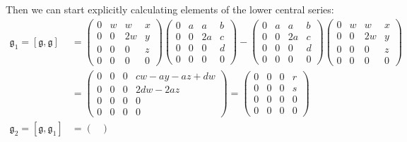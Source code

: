 \documentclass[12pt]{article}
\newcommand{\g}{\mathfrak{g}}
\begin{document}
        Then we can start explicitly calculating elements of the lower central series: 
        \begin{align*}
            \g_1 = [\g, \g] &= \begin{pmatrix}
                0 & w & w & x\\ 
                0 & 0 & 2w & y\\
                0 & 0 & 0 & z\\
                0 & 0 & 0 & 0
            \end{pmatrix}\begin{pmatrix}
                0 & a & a & b\\
                0 & 0 & 2a & c\\
                0 & 0 & 0 & d\\
                0 & 0 & 0 & 0
            \end{pmatrix} - \begin{pmatrix}
                0 & a & a & b\\
                0 & 0 & 2a & c\\
                0 & 0 & 0 & d\\
                0 & 0 & 0 & 0
            \end{pmatrix}\begin{pmatrix}
                0 & w & w & x\\ 
                0 & 0 & 2w & y\\
                0 & 0 & 0 & z\\
                0 & 0 & 0 & 0
            \end{pmatrix}\\ 
            &= \begin{pmatrix}
                0 & 0 & 0 & cw-ay-az+dw\\ 
                0 & 0 & 0 & 2dw-2az\\
                0 & 0 & 0 & 0\\
                0 & 0 & 0 & 0
            \end{pmatrix} = \begin{pmatrix}
                0 & 0 & 0 & r\\ 
                0 & 0 & 0 & s\\
                0 & 0 & 0 & 0\\
                0 & 0 & 0 & 0
            \end{pmatrix}\\ 
            \g_2 = [\g, \g_1] &= \begin{pmatrix}

\end{pmatrix}
\end{align*}
\end{document}
